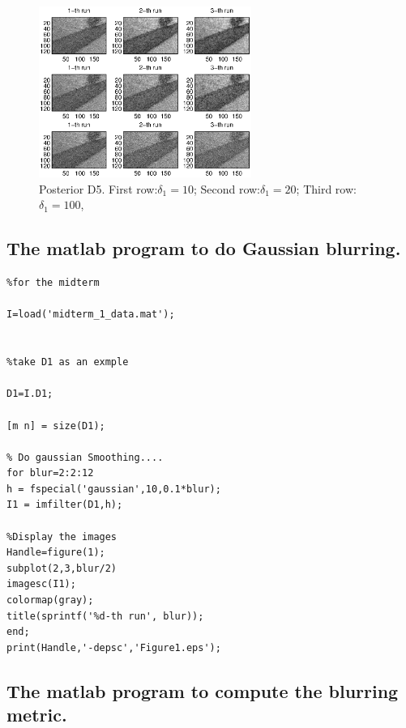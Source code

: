 \documentclass[11pt] {article}
\begin{document}
\begin{figure}
\begin{center}

\includegraphics[height=2.2in]{D5.eps}

\end{center}
\caption{Posterior D5. First row:$\delta_1=10$; Second row:$\delta_1=20$; Third row:$\delta_1=100$, }
\label{fig:D5}
\end{figure}


\subsection{The matlab program to do Gaussian blurring.}

\begin{lstlisting}
%for the midterm

I=load('midterm_1_data.mat');


%take D1 as an exmple

D1=I.D1;

[m n] = size(D1);

% Do gaussian Smoothing....
for blur=2:2:12
h = fspecial('gaussian',10,0.1*blur);
I1 = imfilter(D1,h);

%Display the images
Handle=figure(1);
subplot(2,3,blur/2)
imagesc(I1);
colormap(gray);
title(sprintf('%d-th run', blur));
end;
print(Handle,'-depsc','Figure1.eps');
\end{lstlisting}

\subsection{The matlab program to compute the blurring metric.}
\end{document}
